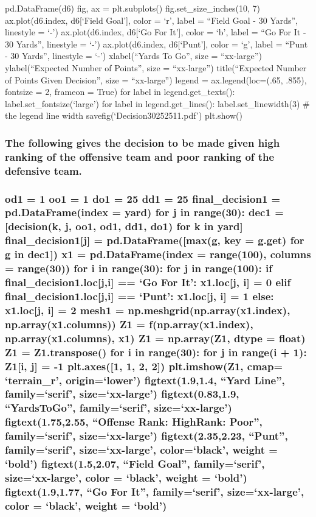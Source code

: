 \documentclass[letterpaper,10pt,english]{/anaconda/lib/python2.7/site-packages/sphinx/texinputs/sphinxhowto}
\begin{document}
{pd.DataFrame(d6) fig, ax = plt.subplots() fig.set\_size\_inches(10, 7)
ax.plot(d6.index, d6{[}`Field Goal'{]}, color = `r', label = ``Field
Goal - 30 Yards'', linestyle = `-') ax.plot(d6.index, d6{[}`Go For
It'{]}, color = `b', label = ``Go For It - 30 Yards'', linestyle = `-')
ax.plot(d6.index, d6{[}`Punt'{]}, color = `g', label = ``Punt - 30
Yards'', linestyle = `-') xlabel(``Yards To Go'', size = ``xx-large'')
ylabel(``Expected Number of Points'', size = ``xx-large'')
title(``Expected Number of Points Given Decision'', size = ``xx-large'')
legend = ax.legend(loc=(.65, .855), fontsize = 2, frameon = True) for
label in legend.get\_texts(): label.set\_fontsize(`large') for label in
legend.get\_lines(): label.set\_linewidth(3) \# the legend line width
savefig(`Decision30252511.pdf') plt.show()}

\subsubsection{The following gives the decision to be made given high ranking of the
offensive team and poor ranking of the defensive team.}\subsubsection{od1 = 1 oo1 = 1 do1 = 25 dd1 = 25 final\_decision1 = pd.DataFrame(index
= yard) for j in range(30): dec1 = {[}decision(k, j, oo1, od1, dd1, do1)
for k in yard{]} final\_decision1{[}j{]} = pd.DataFrame({[}max(g, key =
g.get) for g in dec1{]}) x1 = pd.DataFrame(index = range(100), columns =
range(30)) for i in range(30): for j in range(100): if
final\_decision1.loc{[}j,i{]} == `Go For It': x1.loc{[}j, i{]} = 0 elif
final\_decision1.loc{[}j,i{]} == `Punt': x1.loc{[}j, i{]} = 1 else:
x1.loc{[}j, i{]} = 2 mesh1 = np.meshgrid(np.array(x1.index),
np.array(x1.columns)) Z1 = f(np.array(x1.index), np.array(x1.columns),
x1) Z1 = np.array(Z1, dtype = float) Z1 = Z1.transpose() for i in
range(30): for j in range(i + 1): Z1{[}i, j{]} = -1 plt.axes({[}1, 1, 2,
2{]}) plt.imshow(Z1, cmap= `terrain\_r', origin=`lower')
figtext(1.9,1.4, ``Yard Line'', family=`serif', size=`xx-large')
figtext(0.83,1.9, ``Yards\n  To\n  Go'', family=`serif',
size=`xx-large') figtext(1.75,2.55, ``Offense Rank: High\nDefense Rank:
Poor'', family=`serif', size=`xx-large') figtext(2.35,2.23, ``Punt'',
family=`serif', size=`xx-large', color=`black', weight = `bold')
figtext(1.5,2.07, ``Field Goal'', family=`serif', size=`xx-large', color
= `black', weight = `bold') figtext(1.9,1.77, ``Go For It'',
family=`serif', size=`xx-large', color = `black', weight = `bold')
}
\end{document}
